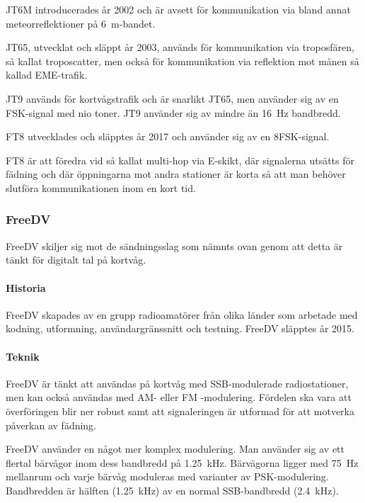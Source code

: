 JT6M introducerades år 2002 och är avsett för kommunikation via bland annat
meteorreflektioner på \qty{6}{\metre}-bandet.

JT65, utvecklat och släppt år 2003, används för kommunikation via troposfären,
så kallat troposcatter, men också för kommunikation via reflektion mot månen
så kallad EME-trafik.

JT9 används för kortvågstrafik och är snarlikt JT65, men använder sig av en
FSK-signal med nio toner.
JT9 använder sig av mindre än \qty{16}{\hertz} bandbredd.

FT8 utvecklades och släpptes år 2017 och använder sig av en 8FSK-signal.

FT8 är att föredra vid så kallat multi-hop via E-skikt, där signalerna utsätts
för fädning och där öppningarna mot andra stationer är korta så att man behöver
slutföra kommunikationen inom en kort tid.

\subsubsection{FreeDV}

FreeDV skiljer sig mot de sändningsslag som nämnts ovan genom att detta är tänkt
för digitalt tal på kortvåg.

\paragraph{Historia}

FreeDV skapades av en grupp radioamatörer från olika länder som arbetade
med kodning, utformning, användargränssnitt och testning.
FreeDV släpptes år 2015.

\paragraph{Teknik}

FreeDV är tänkt att användas på kortvåg med SSB-modulerade radiostationer,
men kan också användas med AM- eller FM -modulering.
Fördelen ska vara att överföringen blir ner robust samt att signaleringen är
utformad för att motverka påverkan av fädning.

FreeDV använder en något mer komplex modulering.
Man använder sig av ett flertal bärvågor inom dess bandbredd på
\qty{1,25}{\kilo\hertz}.
Bärvägorna ligger med \qty{75}{\hertz} mellanrum och varje bärvåg moduleras med
varianter av PSK-modulering.
Bandbredden är hälften (\qty{1,25}{\kilo\hertz}) av en normal SSB-bandbredd
(\qty{2,4}{\kilo\hertz}).

